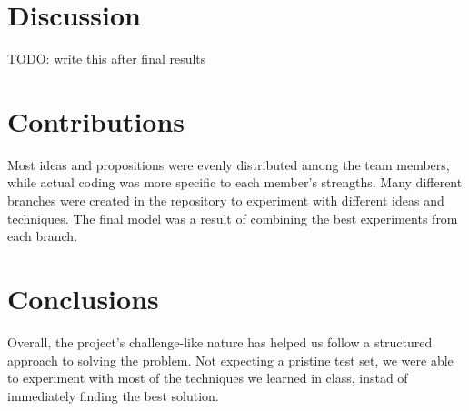 \documentclass[11pt]{article}
\begin{document}
\begin{multicols}{2}
      \section{Discussion}

      TODO: write this after final results

      \section{Contributions}

      Most ideas and propositions were evenly distributed among the team
      members, while actual coding was more specific to each member's
      strengths. Many different branches were created in the repository to
      experiment with different ideas and techniques. The final model was a
      result of combining the best experiments from each branch.

      \section{Conclusions}

      Overall, the project's challenge-like nature has helped us follow a
      structured approach to solving the problem. Not expecting a pristine test
      set, we were able to experiment with most of the techniques we learned in
      class, instad of immediately finding the best solution.

      
      

\end{multicols}
\end{document}
